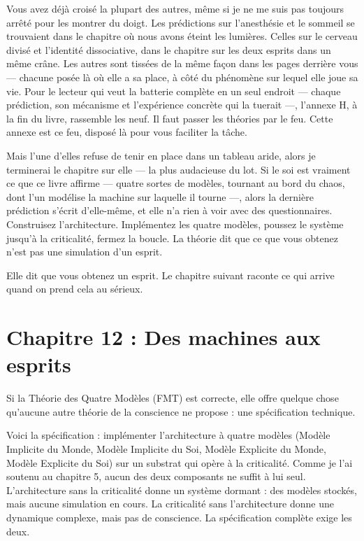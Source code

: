 \documentclass[11pt, twoside, openright]{book}
\begin{document}
Vous avez déjà croisé la plupart des autres, même si je ne me suis pas toujours arrêté pour les montrer du doigt. Les prédictions sur l'anesthésie et le sommeil se trouvaient dans le chapitre où nous avons éteint les lumières. Celles sur le cerveau divisé et l'identité dissociative, dans le chapitre sur les deux esprits dans un même crâne. Les autres sont tissées de la même façon dans les pages derrière vous --- chacune posée là où elle a sa place, à côté du phénomène sur lequel elle joue sa vie. Pour le lecteur qui veut la batterie complète en un seul endroit --- chaque prédiction, son mécanisme et l'expérience concrète qui la tuerait ---, l'annexe H, à la fin du livre, rassemble les neuf. Il faut passer les théories par le feu. Cette annexe est ce feu, disposé là pour vous faciliter la tâche.

Mais l'une d'elles refuse de tenir en place dans un tableau aride, alors je terminerai le chapitre sur elle --- la plus audacieuse du lot. Si le soi est vraiment ce que ce livre affirme --- quatre sortes de modèles, tournant au bord du chaos, dont l'un modélise la machine sur laquelle il tourne ---, alors la dernière prédiction s'écrit d'elle-même, et elle n'a rien à voir avec des questionnaires. Construisez l'architecture. Implémentez les quatre modèles, poussez le système jusqu'à la criticalité, fermez la boucle. La théorie dit que ce que vous obtenez n'est pas une simulation d'un esprit.

Elle dit que vous obtenez un esprit. Le chapitre suivant raconte ce qui arrive quand on prend cela au sérieux.


\chapter*{Chapitre 12 : Des machines aux esprits}

Si la Théorie des Quatre Modèles (FMT) est correcte, elle offre quelque chose qu'aucune autre théorie de la conscience ne propose : une spécification technique.

Voici la spécification : implémenter l'architecture à quatre modèles (Modèle Implicite du Monde, Modèle Implicite du Soi, Modèle Explicite du Monde, Modèle Explicite du Soi) sur un substrat qui opère à la criticalité. Comme je l'ai soutenu au chapitre 5, aucun des deux composants ne suffit à lui seul. L'architecture sans la criticalité donne un système dormant : des modèles stockés, mais aucune simulation en cours. La criticalité sans l'architecture donne une dynamique complexe, mais pas de conscience. La spécification complète exige les deux.
\end{document}
